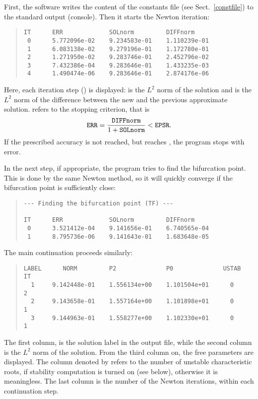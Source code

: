 \documentclass[10pt,a4paper]{ddedoc}
\begin{document}
First, the software writes the content of the constants file (see Sect.\ \ref{constfile}) to the standard output (console). Then it starts the Newton iteration:
{ \small \begin{quote} \begin{lstlisting}[basicstyle=\tt,frame=single]
IT      ERR             SOLnorm         DIFFnorm
 0      5.772096e-02    9.234583e-01    1.110239e-01
 1      6.083138e-02    9.279196e-01    1.172780e-01
 2      1.271950e-02    9.283746e-01    2.452796e-02
 3      7.432386e-04    9.283646e-01    1.433235e-03
 4      1.490474e-06    9.283646e-01    2.874176e-06
\end{lstlisting} \end{quote} } \noindent
Here, each iteration step () is displayed:  is the $L^2$ norm of the solution and  is the $L^2$ norm of the difference between the new and the previous approximate solution.  refers to the stopping criterion, that is
\[
	{\tt ERR} = \frac{{\tt DIFFnorm}}{1+{\tt SOLnorm}} < {\tt EPSR}.
\]
If the prescribed accuracy is not reached, but  reaches , the program stops with error.

In the next step, if appropriate, the program tries to find the bifurcation point. This is done by the same Newton method, so it will quickly converge if the bifurcation point is sufficiently close:
{ \small \begin{quote} \begin{lstlisting}[basicstyle=\tt,frame=single]
--- Finding the bifurcation point (TF) ---

IT      ERR             SOLnorm         DIFFnorm
 0      3.521412e-04    9.141656e-01    6.740565e-04
 1      8.795736e-06    9.141643e-01    1.683648e-05
\end{lstlisting} \end{quote} } \noindent

The main continuation proceeds similarly:
{ \small \begin{quote} \begin{lstlisting}[basicstyle=\tt,frame=single]
LABEL      NORM         P2              P0              USTAB   IT
  1     9.142448e-01    1.556134e+00    1.101504e+01      0     2
  2     9.143658e-01    1.557164e+00    1.101898e+01      0     1
  3     9.144963e-01    1.558277e+00    1.102330e+01      0     1
\end{lstlisting} \end{quote} } \noindent
The first column,  is the solution label in the output file, while the second column is the $L^2$ norm of the solution. From the third column on, the free parameters are displayed. The column denoted by  refers to the number of unstable characteristic roots, if stability computation is turned on (see  below), otherwise it is meaningless. The last column is the number of the Newton iterations, within each continuation step.
\end{document}

